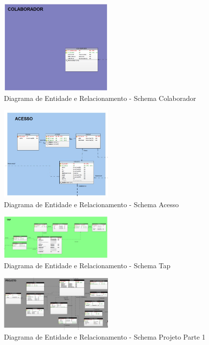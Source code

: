 \documentclass{acm_proc_article-sp}
\begin{document}
\begin{appendices}
\begin{figure}[h]
\centering %
\includegraphics[width=0.5\textwidth]{DER_colaborador.jpg} %
\caption{Diagrama de Entidade e Relacionamento - Schema Colaborador}
\end{figure}

\begin{figure}[h]
\centering %
\includegraphics[width=0.5\textwidth]{DER_acesso.jpg} %
\caption{Diagrama de Entidade e Relacionamento - Schema Acesso}
\end{figure} 

\begin{figure}[h]
\centering %
\includegraphics[width=0.5\textwidth]{DER_tap.jpg} %
\caption{Diagrama de Entidade e Relacionamento - Schema Tap}
\end{figure}

\begin{figure}[h]
\centering %
\includegraphics[width=0.5\textwidth]{DER_projeto_p1.jpg} %
\caption{Diagrama de Entidade e Relacionamento - Schema Projeto Parte 1}
\end{figure}


\end{appendices}
\end{document}
